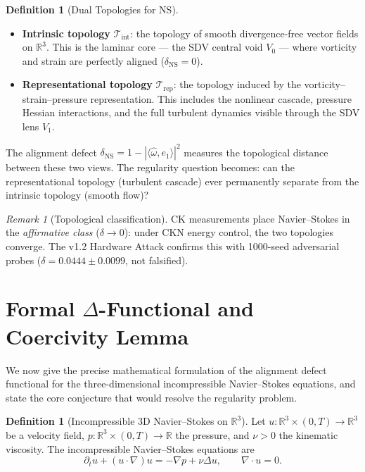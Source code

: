 \documentclass[11pt]{article}
\theoremstyle{definition}
\newtheorem{definition}[theorem]{Definition}
\theoremstyle{remark}
\newtheorem{remark}[theorem]{Remark}
\newcommand{\R}{\mathbb{R}}
\begin{document}
\begin{definition}[Dual Topologies for NS]
\label{def:ns-topo}
\mbox{}
\begin{itemize}
\item \textbf{Intrinsic topology} $\mathcal{T}_{\mathrm{int}}$:
the topology of smooth divergence-free vector fields on $\mathbb{R}^3$.
This is the laminar core --- the SDV central void $V_0$ --- where
vorticity and strain are perfectly aligned ($\delta_{\mathrm{NS}} = 0$).
\item \textbf{Representational topology} $\mathcal{T}_{\mathrm{rep}}$:
the topology induced by the vorticity--strain--pressure representation.
This includes the nonlinear cascade, pressure Hessian interactions,
and the full turbulent dynamics visible through the SDV lens $V_1$.
\end{itemize}
\end{definition}

\noindent
The alignment defect $\delta_{\mathrm{NS}} = 1 - |\langle\hat\omega,
e_1\rangle|^2$ measures the topological distance between these two
views.  The regularity question becomes: can the representational
topology (turbulent cascade) ever permanently separate from the
intrinsic topology (smooth flow)?

\begin{remark}[Topological classification]
CK measurements place Navier--Stokes in the \emph{affirmative class}
($\delta \to 0$): under CKN energy control, the two topologies converge.
The v1.2 Hardware Attack confirms this with 1000-seed adversarial probes
($\delta = 0.0444 \pm 0.0099$, not falsified).
\end{remark}

\section{Formal $\Delta$-Functional and Coercivity Lemma}
\label{sec:delta-coercivity}

We now give the precise mathematical formulation of the alignment defect
functional for the three-dimensional incompressible Navier--Stokes equations,
and state the core conjecture that would resolve the regularity problem.

\medskip

\begin{definition}[Incompressible 3D Navier--Stokes on $\R^3$]
\label{def:ns-equations}
Let $u \colon \R^3 \times (0,T) \to \R^3$ be a velocity field,
$p \colon \R^3 \times (0,T) \to \R$ the pressure, and $\nu > 0$ the
kinematic viscosity.  The incompressible Navier--Stokes equations are
\begin{equation}\label{eq:ns}
\partial_t u + (u \cdot \nabla) u = -\nabla p + \nu \Delta u, \qquad
\nabla \cdot u = 0.
\end{equation}
\end{definition}
\end{document}
